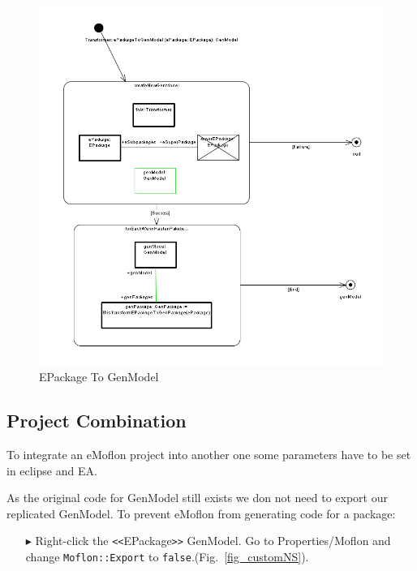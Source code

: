 \begin{figure}[htbp]
\begin{center}  \includegraphics[width=1.0\textwidth]{pics/Ecore2GenModel_Bilder/EA_ePack2gM.png}
        \caption{EPackage To GenModel}  
  \label{fig_pack2gm}
\end{center}
\end{figure} 
  

\subsection{Project Combination} %
\label{sec:Project Combination}

To integrate an eMoflon project into another one some parameters have to be set in eclipse and EA.

As the original code for GenModel still exists we don not need to export our replicated \textsf{GenModel}. To prevent eMoflon from generating code for a package:
\begin{enumerate}
\item[$\blacktriangleright$] Right-click the \texttt{<<}EPackage\texttt{>>} \textsf{GenModel}. Go to Properties/Moflon and change \texttt{Moflon::Export} to \texttt{false}.(Fig.~\ref{fig_customNS}).
\end{enumerate}


